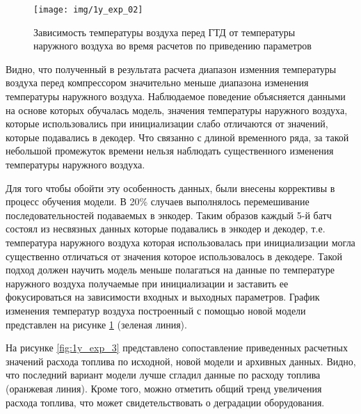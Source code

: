 \documentclass[12pt,a4paper]{article}
\begin{document}
\begin{figure}[htbp]
	\centering\texttt{[image: img/1y\_exp\_02]}
	\caption{Зависимость температуры воздуха перед ГТД от температуры наружного воздуха во время расчетов по приведению параметров}
	\label{fig:1y_exp_02}
\end{figure}


Видно, что полученный в результата расчета диапазон изменния температуры воздуха перед компрессором значительно меньше диапазона изменения температуры наружного воздуха. Наблюдаемое поведение объясняется данными на основе которых обучалась модель, значения температуры наружного воздуха, которые использовались при инициализации слабо отличаются от значений, которые подавались в декодер. Что связанно с длиной временного ряда, за такой небольшой промежуток времени нельзя наблюдать существенного изменения температуры наружного воздуха.


Для того чтобы обойти эту особенность данных, были внесены коррективы в процесс обучения модели. В 20\% случаев выполнялось перемешивание последовательностей подаваемых в энкодер. Таким образов каждый 5-й батч состоял из несвязных данных которые подавались в энкодер и декодер, т.е. температура наружного воздуха которая использовалась при инициализации могла существенно отличаться от значения которое использовалось в декодере. Такой подход должен научить модель меньше полагаться на данные по температуре наружного воздуха получаемые при инициализации и заставить ее фокусироваться на зависимости входных и выходных параметров. График изменения температур воздуха построенный с помощью новой модели представлен на рисунке \ref{fig:1y_exp_02} (зеленая линия).





На рисунке \ref{fig:1y_exp_3} представлено сопоставление приведенных расчетных значений расхода топлива по исходной, новой модели и архивных данных. Видно, что последний вариант модели лучше сгладил данные по расходу топлива (оранжевая линия). Кроме того, можно отметить общий тренд увеличения расхода топлива, что может свидетельствовать о деградации оборудования.
\end{document}

